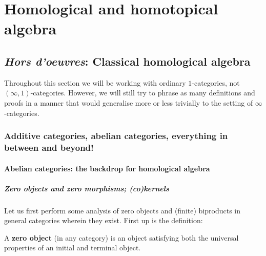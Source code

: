 \chapter{Homological and homotopical algebra}
    \begin{abstract}
        
    \end{abstract}
    
    \minitoc
    
    \section{\textit{Hors d'oeuvres}: Classical homological algebra} \label{section: homological_algebra}
        \begin{convention}
            Throughout this section we will be working with ordinary $1$-categories, not $(\infty, 1)$-categories. However, we will still try to phrase as many definitions and proofs in a manner that would generalise more or less trivially to the setting of $\infty$-categories.
        \end{convention}
    
        \subsection{Additive categories, abelian categories, everything in between and beyond!}
            \subsubsection{Abelian categories: the backdrop for homological algebra}
                \paragraph{Zero objects and zero morphisms; (co)kernels}
                    Let us first perform some analysis of zero objects and (finite) biproducts in general categories wherein they exist. First up is the definition:
                    \begin{definition} \label{def: zero_objects} 
                        A \textbf{zero object} (in any category) is an object satisfying both the universal properties of an initial and terminal object.
                    \end{definition}
                    
                    
